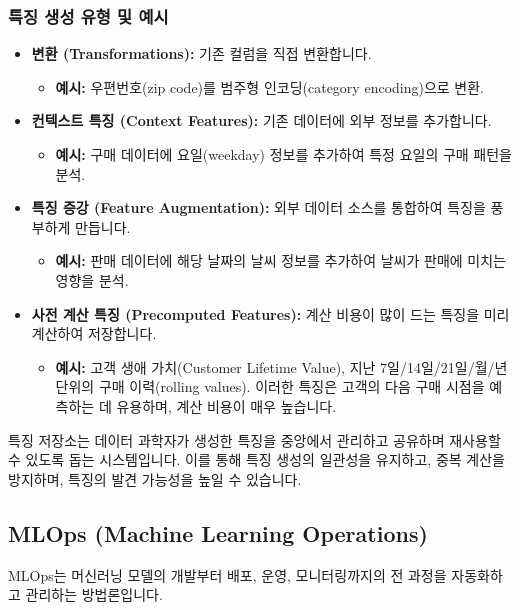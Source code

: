 \documentclass[11pt,a4paper]{article}
\begin{document}
\subsubsection*{특징 생성 유형 및 예시}
\begin{itemize}
    \item \textbf{변환 (Transformations):} 기존 컬럼을 직접 변환합니다.
    \begin{itemize}
        \item \textbf{예시:} 우편번호(zip code)를 범주형 인코딩(category encoding)으로 변환.
    \end{itemize}
    \item \textbf{컨텍스트 특징 (Context Features):} 기존 데이터에 외부 정보를 추가합니다.
    \begin{itemize}
        \item \textbf{예시:} 구매 데이터에 요일(weekday) 정보를 추가하여 특정 요일의 구매 패턴을 분석.
    \end{itemize}
    \item \textbf{특징 증강 (Feature Augmentation):} 외부 데이터 소스를 통합하여 특징을 풍부하게 만듭니다.
    \begin{itemize}
        \item \textbf{예시:} 판매 데이터에 해당 날짜의 날씨 정보를 추가하여 날씨가 판매에 미치는 영향을 분석.
    \end{itemize}
    \item \textbf{사전 계산 특징 (Precomputed Features):} 계산 비용이 많이 드는 특징을 미리 계산하여 저장합니다.
    \begin{itemize}
        \item \textbf{예시:} 고객 생애 가치(Customer Lifetime Value), 지난 7일/14일/21일/월/년 단위의 구매 이력(rolling values). 이러한 특징은 고객의 다음 구매 시점을 예측하는 데 유용하며, 계산 비용이 매우 높습니다.
    \end{itemize}
\end{itemize}

\begin{tcolorbox}[summarybox={특징 저장소 (Feature Store)}]
특징 저장소는 데이터 과학자가 생성한 특징을 중앙에서 관리하고 공유하며 재사용할 수 있도록 돕는 시스템입니다. 이를 통해 특징 생성의 일관성을 유지하고, 중복 계산을 방지하며, 특징의 발견 가능성을 높일 수 있습니다.
\end{tcolorbox}

\subsection*{MLOps (Machine Learning Operations)}
MLOps는 머신러닝 모델의 개발부터 배포, 운영, 모니터링까지의 전 과정을 자동화하고 관리하는 방법론입니다.
\end{document}
